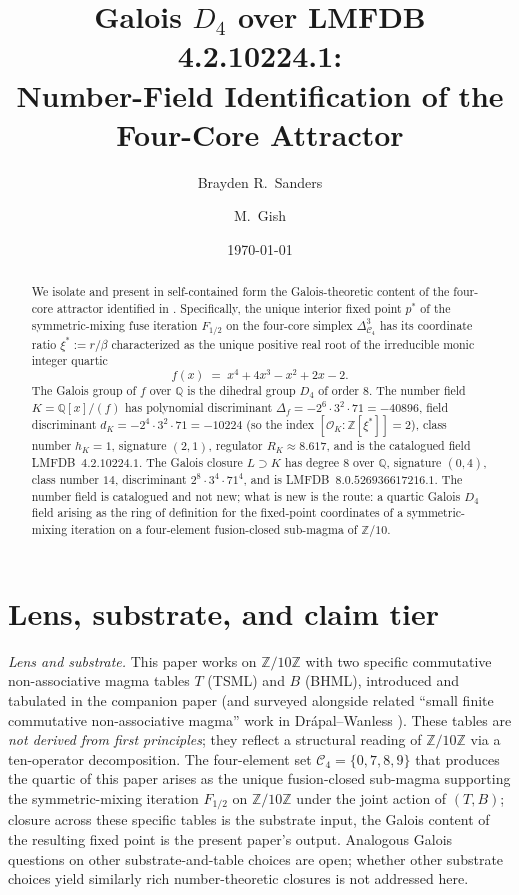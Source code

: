 \documentclass[11pt,reqno]{amsart}
\title[Galois $D_{4}$ over LMFDB 4.2.10224.1]
{Galois $D_{4}$ over LMFDB 4.2.10224.1: \\
 Number-Field Identification of the Four-Core Attractor}
\author{Brayden R.\ Sanders}
\author{M.\ Gish}
\date{\today}
\theoremstyle{plain}
\theoremstyle{definition}
\theoremstyle{remark}
\newcommand{\Q}{\mathbb{Q}}
\newcommand{\Z}{\mathbb{Z}}
\newcommand{\Cfour}{\mathcal{C}_{4}}
\newcommand{\TS}{T}
\newcommand{\BH}{B}
\begin{document}
\begin{abstract}
We isolate and present in self-contained form the Galois-theoretic
content of the four-core attractor identified in \cite{SandersGishFourCore}.
Specifically, the unique interior fixed point $p^{*}$ of the
symmetric-mixing fuse iteration $F_{1/2}$ on the four-core simplex
$\Delta^{3}_{\Cfour}$ has its coordinate ratio $\xi^{*} := r/\beta$
characterized as the unique positive real root of the irreducible monic
integer quartic
\[
  f(x) \;=\; x^{4} + 4x^{3} - x^{2} + 2x - 2.
\]
The Galois group of $f$ over $\Q$ is the dihedral group $D_{4}$ of order
$8$. The number field $K = \Q[x]/(f)$ has polynomial discriminant
$\Delta_{f} = -2^{6}\cdot 3^{2}\cdot 71 = -40896$, field discriminant
$d_{K} = -2^{4}\cdot 3^{2}\cdot 71 = -10224$ (so the index
$[\mathcal{O}_{K} : \Z[\xi^{*}]] = 2$), class number $h_{K} = 1$,
signature $(2,1)$, regulator $R_{K} \approx 8.617$, and is the catalogued
field LMFDB~$4.2.10224.1$. The Galois closure
$L \supset K$ has degree $8$ over $\Q$, signature $(0,4)$, class number
$14$, discriminant $2^{8}\cdot 3^{4}\cdot 71^{4}$, and is
LMFDB~$8.0.526936617216.1$. The number field is catalogued and not new;
what is new is the route: a quartic Galois $D_{4}$ field arising as the
ring of definition for the fixed-point coordinates of a symmetric-mixing
iteration on a four-element fusion-closed sub-magma of $\Z/10$.
\end{abstract}

\maketitle

\tableofcontents

\section*{Lens, substrate, and claim tier}

\noindent\textit{Lens and substrate.} This paper works on
$\Z/10\Z$ with two specific commutative non-associative magma tables
$\TS$ (TSML) and $\BH$ (BHML), introduced and tabulated in the
companion paper \cite{SandersGishFourCore} (and surveyed alongside
related ``small finite commutative non-associative magma'' work in
Dr\'apal--Wanless \cite{DrapalWanless2021}). These tables are
\emph{not derived from first principles}; they reflect a structural
reading of $\Z/10\Z$ via a ten-operator decomposition. The four-element
set $\Cfour = \{0, 7, 8, 9\}$ that produces the quartic of this paper
arises as the unique fusion-closed sub-magma supporting the
symmetric-mixing iteration $F_{1/2}$ on $\Z/10\Z$ under the joint
action of $(\TS, \BH)$; closure across these specific tables is the
substrate input, the Galois content of the resulting fixed point is
the present paper's output. Analogous Galois questions on other
substrate-and-table choices are open; whether other substrate choices
yield similarly rich number-theoretic closures is not addressed here.
\end{document}
